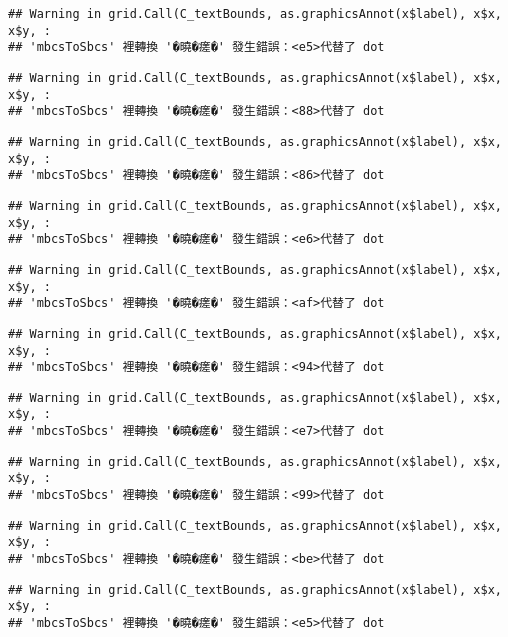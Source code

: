 \documentclass[
]{article}
\begin{document}
\begin{verbatim}
## Warning in grid.Call(C_textBounds, as.graphicsAnnot(x$label), x$x, x$y, :
## 'mbcsToSbcs' 裡轉換 '�曉�瘥�' 發生錯誤：<e5>代替了 dot
\end{verbatim}

\begin{verbatim}
## Warning in grid.Call(C_textBounds, as.graphicsAnnot(x$label), x$x, x$y, :
## 'mbcsToSbcs' 裡轉換 '�曉�瘥�' 發生錯誤：<88>代替了 dot
\end{verbatim}

\begin{verbatim}
## Warning in grid.Call(C_textBounds, as.graphicsAnnot(x$label), x$x, x$y, :
## 'mbcsToSbcs' 裡轉換 '�曉�瘥�' 發生錯誤：<86>代替了 dot
\end{verbatim}

\begin{verbatim}
## Warning in grid.Call(C_textBounds, as.graphicsAnnot(x$label), x$x, x$y, :
## 'mbcsToSbcs' 裡轉換 '�曉�瘥�' 發生錯誤：<e6>代替了 dot
\end{verbatim}

\begin{verbatim}
## Warning in grid.Call(C_textBounds, as.graphicsAnnot(x$label), x$x, x$y, :
## 'mbcsToSbcs' 裡轉換 '�曉�瘥�' 發生錯誤：<af>代替了 dot
\end{verbatim}

\begin{verbatim}
## Warning in grid.Call(C_textBounds, as.graphicsAnnot(x$label), x$x, x$y, :
## 'mbcsToSbcs' 裡轉換 '�曉�瘥�' 發生錯誤：<94>代替了 dot
\end{verbatim}

\begin{verbatim}
## Warning in grid.Call(C_textBounds, as.graphicsAnnot(x$label), x$x, x$y, :
## 'mbcsToSbcs' 裡轉換 '�曉�瘥�' 發生錯誤：<e7>代替了 dot
\end{verbatim}

\begin{verbatim}
## Warning in grid.Call(C_textBounds, as.graphicsAnnot(x$label), x$x, x$y, :
## 'mbcsToSbcs' 裡轉換 '�曉�瘥�' 發生錯誤：<99>代替了 dot
\end{verbatim}

\begin{verbatim}
## Warning in grid.Call(C_textBounds, as.graphicsAnnot(x$label), x$x, x$y, :
## 'mbcsToSbcs' 裡轉換 '�曉�瘥�' 發生錯誤：<be>代替了 dot
\end{verbatim}

\begin{verbatim}
## Warning in grid.Call(C_textBounds, as.graphicsAnnot(x$label), x$x, x$y, :
## 'mbcsToSbcs' 裡轉換 '�曉�瘥�' 發生錯誤：<e5>代替了 dot
\end{verbatim}
\end{document}
